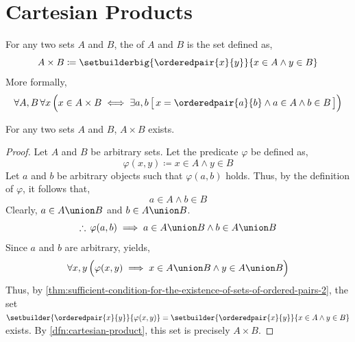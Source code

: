 \newpage
\section{Cartesian Products}
\begin{dfn}
    \label{dfn:cartesian-product}
    For any two sets \( A \) and \( B \), the  of
    \( A \) and \( B \) is the set defined as,
    \begin{equation*}
        A \times B \coloneq \setbuilderbig{\orderedpair{x}{y}}{x \in A \land y \in B}
    \end{equation*}
    More formally,
    \begin{equation*}
        \forall A,B \, \forall x  \, \Big( x \in A \times B \iff
        \exists a,b \, \big[ \, x = \orderedpair{a}{b} \land a \in A \land b \in B \, \big]\Big)
    \end{equation*}
\end{dfn}

\begin{thm}
    \label{thm:existence-of-cartesian-product}
    For any two sets \( A \) and \( B \), \( A \times B \) exists.
\end{thm}

\begin{proof}
    Let \( A \) and \( B \) be arbitrary sets. Let the predicate \( \varphi \) be defined as,
    \begin{equation*}
        \varphi(x,y) \coloneq x \in A \land y \in B
    \end{equation*}
    Let \( a \) and \( b \) be arbitrary objects such that \( \varphi(a,b) \) holds.
    Thus, by the definition of \( \varphi \), it follows that,
    \begin{equation*}
        a \in A \land b \in B
    \end{equation*}
    Clearly, \( a \in A \union B \) and \( b \in A \union B \).
    \begin{equation*}
        \therefore \, \varphi(a,b) \implies a \in A \union B \land b \in A \union B
    \end{equation*}
    Since \( a \) and \( b \) are arbitrary,  yields,
    \begin{equation*}
        \forall x,y \, \Big( \varphi(x,y) \implies x \in A \union B \land y \in A \union B \Big)
    \end{equation*}
    Thus, by \cref{thm:sufficient-condition-for-the-existence-of-sets-of-ordered-pairs-2}, the set
    \( \setbuilder{\orderedpair{x}{y}}{\varphi(x,y)} = \setbuilder{\orderedpair{x}{y}}{x \in A \land y \in B} \)
    exists. By \cref{dfn:cartesian-product}, this set is precisely \( A \times B \).
\end{proof}

